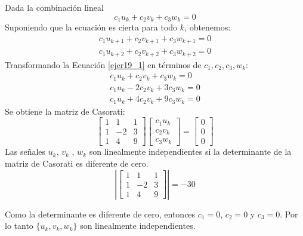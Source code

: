 \documentclass[12pt]{article}
\begin{document}
Dada la combinación lineal
\begin{equation}
    c_1u_k+c_2v_k+c_3w_k=0
\end{equation}
Suponiendo que la ecuación es cierta para todo $k$, obtenemos:
\begin{equation}
    \begin{matrix}
    c_1u_{k+1}+c_2v_{k+1}+c_3w_{k+1}=0 \\ 
    c_1u_{k+2}+c_2v_{k+2}+c_3w_{k+2}=0
    \end{matrix}
\label{ejer19_1}
\end{equation}
Transformando la Ecuación \ref{ejer19_1} en términos de $c_1, c_2, c_3, w_k$:
\begin{equation}
    \begin{matrix}
    c_1u_k+ c_2v_k+ c_3w_k=0 \\ 
    c_1u_k-2c_2v_k+3c_3w_k=0 \\
    c_1u_k+4c_2v_k+9c_3w_k=0
    \end{matrix}
\end{equation}
Se obtiene la matriz de Casorati:
\begin{equation}
    \begin{bmatrix}
        1 &  1 &  1 \\ 
        1 & -2 &  3 \\ 
        1 &  4 &  9
    \end{bmatrix}
    \begin{bmatrix}
        c_1u_k \\ 
        c_2v_k \\ 
        c_3w_k
    \end{bmatrix} = 
    \begin{bmatrix}
        0 \\ 
        0 \\ 
        0
    \end{bmatrix}
\end{equation}
Las señales $u_k$, $v_k$ , $w_k$ son linealmente independientes si la determinante de la matriz de Casorati es diferente de cero.
\begin{equation}
    \left| \begin{bmatrix}
                1 &  1 &  1 \\ 
                1 & -2 &  3 \\ 
                1 &  4 &  9
           \end{bmatrix} \right| = -30
\end{equation}

Como la determinante es diferente de cero, entonces $c_1=0$, $c_2=0$ y $c_3=0$. Por lo tanto $ \{ u_k, v_k, w_k \}$ son linealmente independientes.\\
\end{document}
